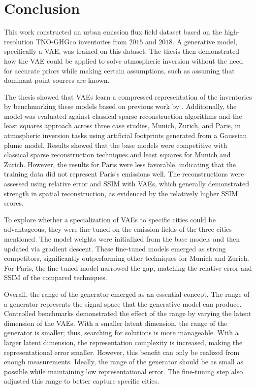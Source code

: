 
\chapter{Conclusion}\label{chapter:conclusion}
This work constructed an urban emission flux field dataset based on the high-resolution TNO-GHGco inventories from $2015$ and $2018$.
A generative model, specifically a \gls{VAE}, was trained on this dataset.
The thesis then demonstrated how the \gls{VAE} could be applied to solve atmospheric inversion without the need for accurate priors while making certain assumptions, such as assuming that dominant point sources are known.

The thesis showed that \gls{VAE}s learn a compressed representation of the inventories by benchmarking these models based on previous work by \textcite{CSUsingAI}.
Additionally, the model was evaluated against classical sparse reconstruction algorithms and the least squares approach across three case studies, Munich, Zurich, and Paris, in atmospheric inversion tasks using artificial footprints generated from a Gaussian plume model.
Results showed that the base models were competitive with classical sparse reconstruction techniques and least squares for Munich and Zurich.
However, the results for Paris were less favorable, indicating that the training data did not represent Paris's emissions well.
The reconstructions were assessed using relative error and \gls{SSIM} with \gls{VAE}s, which generally demonstrated strength in spatial reconstruction, as evidenced by the relatively higher \gls{SSIM} scores.

To explore whether a specialization of \gls{VAE}s to specific cities could be advantageous, they were fine-tuned on the emission fields of the three cities mentioned.
The model weights were initialized from the base models and then updated via gradient descent.
These fine-tuned models emerged as strong competitors, significantly outperforming other techniques for Munich and Zurich.
For Paris, the fine-tuned model narrowed the gap, matching the relative error and \gls{SSIM} of the compared techniques.

Overall, the range of the generator emerged as an essential concept. The range of a generator represents the signal space that the generative model can produce.
Controlled benchmarks demonstrated the effect of the range by varying the latent dimension of the \gls{VAE}s.
With a smaller latent dimension, the range of the generator is smaller; thus, searching for solutions is more manageable.
With a larger latent dimension, the representation complexity is increased, making the representational error smaller.
However, this benefit can only be realized from enough measurements.
Ideally, the range of the generator should be as small as possible while maintaining low representational error.
The fine-tuning step also adjusted this range to better capture specific cities.

